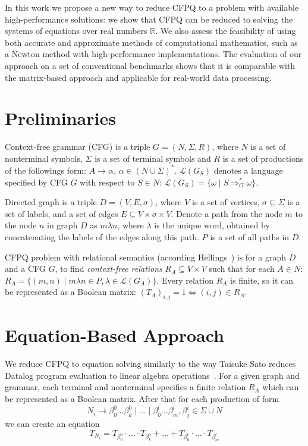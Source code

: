 \documentclass[sigconf]{acmart}
\begin{document}
In this work we propose a new way to reduce CFPQ to a problem with available high-performance solutions: we show that CFPQ can be reduced to solving the systems of equations over real numbers $\mathbb{R}$.
We also assess the feasibility of using both accurate and approximate methods of computational mathematics, such as a Newton method with high-performance implementations.
The evaluation of our approach on a set of conventional benchmarks shows that it is comparable with the matrix-based approach and applicable for real-world data processing.

\section{Preliminaries}

Context-free grammar (CFG) is a triple $G=(N, \Sigma, R)$, where $N$ is a set of nonterminal symbols, $\Sigma$ is a set of terminal symbols and $R$ is a set of productions of the followings form: $A \to \alpha$, $\alpha \in (N \cup \Sigma)^*$.
$\mathcal{L}(G_S)$ denotes a language specified by CFG $G$ with respect to $S \in N$: $\mathcal{L}(G_S) = \{\omega \mid S \Rightarrow_{G}^{*} \omega\}$.

Directed graph is a triple $D = (V,E,\sigma)$, where $V$ is a set of vertices, $\sigma \subseteq \Sigma$ is a set of labels, and a set of edges $E\subseteq V\times \sigma \times V$.
Denote a path from the node $m$ to the node $n$ in graph $D$ as $m\lambda n$, where
$\lambda$ is the unique word, obtained by concatenating the labels of the edges along this path.
$P$ is a set of all paths in $D$.

CFPQ problem with relational semantics (according Hellings~\cite{hellings2014conjunctive}) is for a graph $D$ and a CFG $G$, to find \emph{context-free relations} $R_A \subseteq V \times V$ such that for each $A \in N$: $R_A = \{(m, n) \mid m\lambda n \in P, \lambda \in \mathcal{L}(G_A)\}.$
Every relation $R_A$ is finite, so it can be represented as a Boolean matrix: $(T_A)_{i,j} = 1 \iff (i,j) \in R_A$.

\section{Equation-Based Approach}

We reduce CFPQ to equation solving similarly to the way Taisuke Sato reduces Datalog program evaluation to linear algebra operations~\cite{sato2017linear}.
For a given graph and grammar, each terminal and nonterminal specifies a finite relation $R_A$ which can be represented as a Boolean matrix.
After that for each production of form $$N_i \to \beta^0_0 \dots \beta^0_k \mid \ldots \mid \beta^l_0 \dots \beta^l_m, \beta^i_j \in \Sigma \cup N$$ we can create an equation $$T_{N_i} = T_{\beta^0_0}\cdot \ldots \cdot T_{\beta^0_k} + \ldots + T_{\beta^l_0}\cdot \ldots \cdot T_{\beta^l_m}$$
\end{document}
